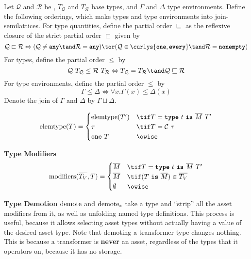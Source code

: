 \documentclass[10pt]{article}
\begin{document}
\begin{definition}
    Let $\mathcal{Q}$ and $\mathcal{R}$ be \typeQuantities, $T_\mathcal{Q}$ and $T_\mathcal{R}$ base types, and $\Gamma$ and $\Delta$ type environments.
    Define the following orderings, which make types and type environments into join-semilattices.
    For type quantities, define the partial order $\sqsubseteq$ as the reflexive closure of the strict partial order $\sqsubset$ given by
    \[
        \mathcal{Q} \sqsubset \mathcal{R} \iff (\mathcal{Q} \neq \any \tand \mathcal{R} = \any) \tor (\mathcal{Q} \in \curlys{\exactlyone, \every} \tand \mathcal{R} = \nonempty)
    \]
    For types, define the partial order $\leq$ by
    \[
        \mathcal{Q}~T_\mathcal{Q} \leq \mathcal{R}~T_\mathcal{R} \iff T_\mathcal{Q} = T_\mathcal{R} \tand \mathcal{Q} \sqsubseteq \mathcal{R}
    \]
    For type environments, define the partial order $\leq$ by
    \[
        \Gamma \leq \Delta \iff \forall x. \Gamma(x) \leq \Delta(x)
    \]
    Denote the join of $\Gamma$ and $\Delta$ by $\Gamma \sqcup \Delta$.
\end{definition}

\begin{align*}
    \elemtype(T) =
    \begin{cases}
        \elemtype(T') & \tif T = \type~t~\is~\overline{M}~T' \\
        \tau & \tif T = \mathcal{C}~\tau \\
        \exactlyone~T & \owise
    \end{cases}
\end{align*}

 \textbf{Type Modifiers}
\begin{align*}
    \modifiers(\overline{T_V}, T) =
    \begin{cases}
        \overline{M} & \tif T = \type~t~\is~\overline{M}~T' \\
        \overline{M} & \tif (T~\is~\overline{M}) \in \overline{T_V} \\
        \emptyset & \owise
    \end{cases}
\end{align*}

\framebox{$\demoteT(\tau) = \sigma$}
 \textbf{Type Demotion}
$\text{demote}$ and $\text{demote}_*$ take a type and ``strip'' all the asset modifiers from it, as well as unfolding named type definitions.
This process is useful, because it allows selecting asset types without actually having a value of the desired asset type.
Note that demoting a transformer type changes nothing.
This is because a transformer is \textbf{never} an asset, regardless of the types that it operators on, because it has no storage.
\end{document}
